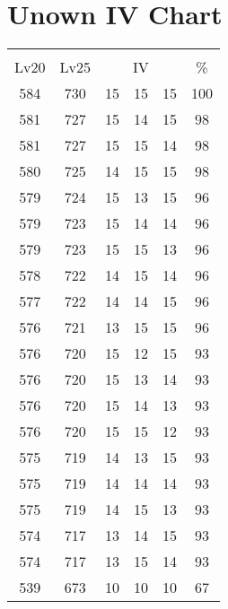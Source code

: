 \documentclass{article}%
\begin{document}
%
\normalsize%
\section{Unown IV Chart}%
\label{sec:Unown IV Chart}%
\renewcommand{\arraystretch}{1.5}%
\begin{tabular}{|c|c|c|c|c|c|}%
\hline%
\multicolumn{6}{|c|}{\textcolor{white}{ 
\linebreak{Unown}
}%
\cellcolor{black}}\\%
\multicolumn{1}{|c}{Lv20}&\multicolumn{1}{c|}{Lv25}&\multicolumn{3}{c|}{IV}&\multicolumn{1}{|c|}{\%}\\%
\hline%
\rowcolor{color100}%
584&730&15&15&15&100\\%
\hline%
\rowcolor{color98}%
581&727&15&14&15&98\\%
\hline%
\rowcolor{color98}%
581&727&15&15&14&98\\%
\hline%
\rowcolor{color98}%
580&725&14&15&15&98\\%
\hline%
\rowcolor{color96}%
579&724&15&13&15&96\\%
\hline%
\rowcolor{color96}%
579&723&15&14&14&96\\%
\hline%
\rowcolor{color96}%
579&723&15&15&13&96\\%
\hline%
\rowcolor{color96}%
578&722&14&15&14&96\\%
\hline%
\rowcolor{color96}%
577&722&14&14&15&96\\%
\hline%
\rowcolor{color96}%
576&721&13&15&15&96\\%
\hline%
\rowcolor{color93}%
576&720&15&12&15&93\\%
\hline%
\rowcolor{color93}%
576&720&15&13&14&93\\%
\hline%
\rowcolor{color93}%
576&720&15&14&13&93\\%
\hline%
\rowcolor{color93}%
576&720&15&15&12&93\\%
\hline%
\rowcolor{color93}%
575&719&14&13&15&93\\%
\hline%
\rowcolor{color93}%
575&719&14&14&14&93\\%
\hline%
\rowcolor{color93}%
575&719&14&15&13&93\\%
\hline%
\rowcolor{color93}%
574&717&13&14&15&93\\%
\hline%
\rowcolor{color93}%
574&717&13&15&14&93\\%
\hline%
\rowcolor{color91}%
539&673&10&10&10&67\\%
\end{tabular}

%
\end{document}
